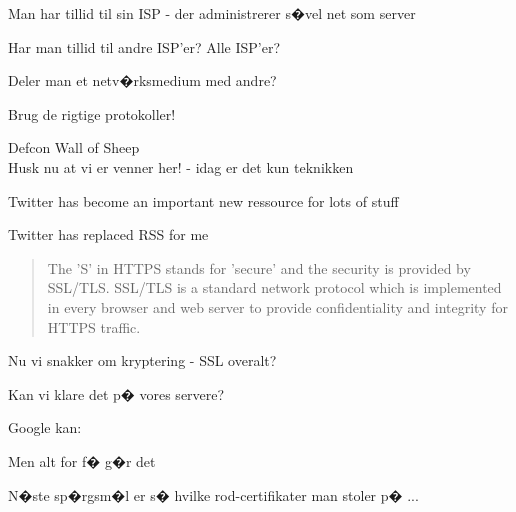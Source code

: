\documentclass[20pt,landscape,a4paper,footrule]{foils}
\begin{document}


\begin{list1}
\item Man har tillid til sin ISP - der administrerer s�vel net som server
\end{list1}


\begin{list1}
\item Har man tillid til andre ISP'er? Alle ISP'er?
\item Deler man et netv�rksmedium med andre?
\item {\color{green}Brug de rigtige protokoller!}
\end{list1}







\begin{center}
Defcon Wall of Sheep\\
Husk nu at vi er venner her! - idag er det kun teknikken
\end{center}







\begin{list1}
\item Twitter has become an important new ressource for lots of stuff
\item Twitter has replaced RSS for me
\end{list1}


\begin{quote}
The 'S' in HTTPS stands for 'secure' and the security is provided by SSL/TLS. SSL/TLS is a standard network protocol which is implemented in every browser and web server to provide confidentiality and integrity for HTTPS traffic.
\end{quote}

\begin{list1}
\item Nu vi snakker om kryptering - SSL overalt?
\item Kan vi klare det p� vores servere?
\pause
\item Google kan:\\
\item Men alt for f� g�r det
\end{list1}
\pause
\centerline{N�ste sp�rgsm�l er s� hvilke rod-certifikater man stoler p� ...}
\end{document}
